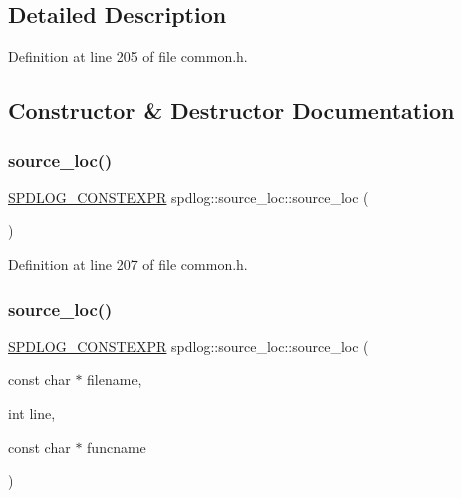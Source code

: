 \subsection{Detailed Description}


Definition at line 205 of file common.\+h.



\subsection{Constructor \& Destructor Documentation}
\mbox{\label{structspdlog_1_1source__loc_a342ef1c40ab4d15356f60fd214c38044}} 
\subsubsection{\texorpdfstring{source\+\_\+loc()}{source\_loc()}\hspace{0.1cm}{\footnotesize\ttfamily [1/2]}}
{\footnotesize\ttfamily \hyperlink{common_8h_a8747e6feba8bf2d3f204cb76bfd4607a}{S\+P\+D\+L\+O\+G\+\_\+\+C\+O\+N\+S\+T\+E\+X\+PR} spdlog\+::source\+\_\+loc\+::source\+\_\+loc (\begin{DoxyParamCaption}{ }\end{DoxyParamCaption})\hspace{0.3cm}{\ttfamily [inline]}}



Definition at line 207 of file common.\+h.

\mbox{\label{structspdlog_1_1source__loc_a162cee7b0c3236e0baa0e7d7d8a4cb7b}} 
\subsubsection{\texorpdfstring{source\+\_\+loc()}{source\_loc()}\hspace{0.1cm}{\footnotesize\ttfamily [2/2]}}
{\footnotesize\ttfamily \hyperlink{common_8h_a8747e6feba8bf2d3f204cb76bfd4607a}{S\+P\+D\+L\+O\+G\+\_\+\+C\+O\+N\+S\+T\+E\+X\+PR} spdlog\+::source\+\_\+loc\+::source\+\_\+loc (\begin{DoxyParamCaption}\item[{const char $\ast$}]{filename,  }\item[{int}]{line,  }\item[{const char $\ast$}]{funcname }\end{DoxyParamCaption})\hspace{0.3cm}{\ttfamily [inline]}}



